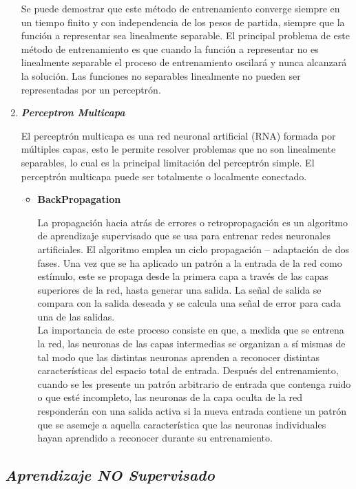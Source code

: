 \documentclass[journal]{IEEEtran}
\begin{document}
\begin{enumerate}
Se puede demostrar que este método de entrenamiento converge siempre en un tiempo finito y con independencia de los pesos de partida, siempre que la función a representar sea linealmente separable. El principal problema de este método de entrenamiento es que cuando la función a representar no es linealmente separable el proceso de entrenamiento oscilará y nunca alcanzará la solución. Las funciones no separables linealmente no pueden ser representadas por un perceptrón.\\
    
\item \textbf{\emph{Perceptron Multicapa}}
    		
El perceptrón multicapa es una red neuronal artificial (RNA) formada por múltiples capas, esto le permite resolver problemas que no son linealmente separables, lo cual es la principal limitación del perceptrón simple. El perceptrón multicapa puede ser totalmente o localmente conectado. 
    		
\begin{itemize}
\item \textbf{BackPropagation}
    			
La propagación hacia atrás de errores o retropropagación es un algoritmo de aprendizaje supervisado que se usa para entrenar redes neuronales artificiales. El algoritmo emplea un ciclo propagación – adaptación de dos fases. Una vez que se ha aplicado un patrón a la entrada de la red como estímulo, este se propaga desde la primera capa a través de las capas superiores de la red, hasta generar una salida. La señal de salida se compara con la salida deseada y se calcula una señal de error para cada una de las salidas.\\
    			
La importancia de este proceso consiste en que, a medida que se entrena la red, las neuronas de las capas intermedias se organizan a sí mismas de tal modo que las distintas neuronas aprenden a reconocer distintas características del espacio total de entrada. Después del entrenamiento, cuando se les presente un patrón arbitrario de entrada que contenga ruido o que esté incompleto, las neuronas de la capa oculta de la red responderán con una salida activa si la nueva entrada contiene un patrón que se asemeje a aquella característica que las neuronas individuales hayan aprendido a reconocer durante su entrenamiento.
\end{itemize}
\end{enumerate}
  
\subsection{\textbf{\emph{Aprendizaje NO Supervisado}}}
\end{document}

